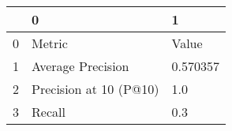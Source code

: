\begin{tabular}{lll}
\toprule
{} &                       0 &         1 \\
\midrule
0 &                  Metric &     Value \\
1 &       Average Precision &  0.570357 \\
2 &  Precision at 10 (P@10) &       1.0 \\
3 &                  Recall &       0.3 \\
\bottomrule
\end{tabular}
